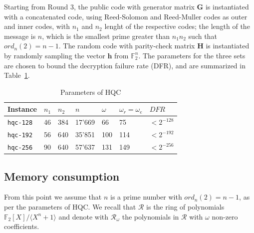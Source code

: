 	Starting from Round 3, the public code with generator matrix $\mathbf{G}$ is instantiated with a concatenated code, using
	Reed-Solomon and Reed-Muller codes as outer and inner codes, with $n_1$ and $n_2$ lenght of the respective codes; the 
	length of the message is $n$, which is the smallest prime greater than $n_1n_2$ such that $ord_n(2) = n-1$.
	The random code with parity-check matrix $\mathbf{H}$ is instantiated by randomly sampling the vector $\mathbf{h}$
	from $\mathds{F}_2^n$.
	The parameters for the three sets are chosen to bound the decryption failure rate (DFR), and are summarized in Table~\ref{tab:parameters}.
	\begin{table}[ht]\small
		\centering
		\caption{Parameters of HQC}
		\begin{tabularx}{\textwidth}{X|X|X|X|X|X|X}
			Instance & $n_1$ & $n_2$ & $n$ & $\omega$ & $\omega_r = \omega_e$ & $DFR$ \\
			\hline
			\texttt{hqc-128} & 46 & 384 & 17'669 & 66 & 75 & $<2^{-128}$ \\
			\hline
			\texttt{hqc-192} & 56 & 640 & 35'851 & 100 & 114 & $<2^{-192}$ \\
			\hline
			\texttt{hqc-256} & 90 & 640 & 57'637 & 131 & 149 & $<2^{-256}$ \\
		\end{tabularx}
        \label{tab:parameters}
	\end{table}

	\subsection{Memory consumption\\}\label{subsec:memory}
		From this point we assume that $n$ is a prime number with $ord_n(2) = n-1$, as per the parameters of HQC. We recall that 
		$\mathcal{R}$ is the ring of polynomials $\mathds{F}_2[X]/\langle X^n+1\rangle$ and denote with $\mathcal{R}_\omega$ the polynomials
		in $\mathcal{R}$ with $\omega$ non-zero coefficients.
		
